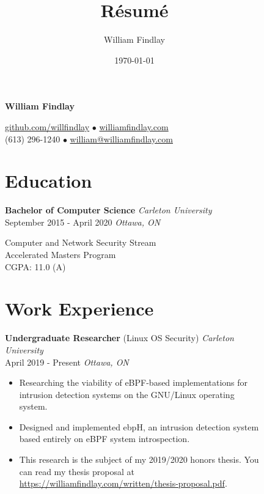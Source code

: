 \documentclass[
]{article}
\title{Résumé}
\author{William Findlay}
\date{\today}
\theoremstyle{plain}
\theoremstyle{remark}
\theoremstyle{definition}
\renewcommand{\maketitle}{\relax}
\begin{document}
\maketitle

\begin{figure}
\small
\begin{minipage}[t]{0.65\textwidth}
\begin{center}
{\Huge\bfseries William Findlay}

\color{gray}

\href{https://www.github.com/willfindlay}{\color{gray}github.com/willfindlay} $\bullet$ \href{http://www.williamfindlay.com}{\color{gray}williamfindlay.com}\\
{\color{gray}(613) 296-1240} $\bullet$ \href{mailto:william@williamfindlay.com}{\color{gray}william@williamfindlay.com}
\end{center}

\color{gray}

\section{Education}
\color{black}
\textbf{Bachelor of Computer Science} \hfill \emph{Carleton University}\\
{September 2015 - April 2020} \hfill\emph {Ottawa, ON}
\color{gray}

Computer and Network Security Stream\\
Accelerated Masters Program\\
CGPA: 11.0 (A)

\section{Work Experience}

\color{black}
\textbf{Undergraduate Researcher} (Linux OS Security) \hfill \emph{Carleton University}\\
April 2019 - Present \hfill\emph {Ottawa, ON}
\color{gray}
\begin{itemize}[itemsep=0em]
\item Researching the viability of eBPF-based implementations for intrusion detection systems on the GNU/Linux operating system.
\item Designed and implemented ebpH, an intrusion detection system based entirely on eBPF system introspection.
\item This research is the subject of my 2019/2020 honors thesis. You can read my thesis proposal at \url{https://williamfindlay.com/written/thesis-proposal.pdf}.
\end{itemize}


\end{minipage}
\end{figure}
\end{document}
